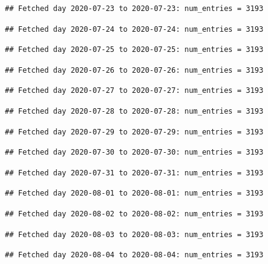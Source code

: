 \documentclass[]{article}
\begin{document}
\begin{verbatim}
## Fetched day 2020-07-23 to 2020-07-23: num_entries = 3193
\end{verbatim}

\begin{verbatim}
## Fetched day 2020-07-24 to 2020-07-24: num_entries = 3193
\end{verbatim}

\begin{verbatim}
## Fetched day 2020-07-25 to 2020-07-25: num_entries = 3193
\end{verbatim}

\begin{verbatim}
## Fetched day 2020-07-26 to 2020-07-26: num_entries = 3193
\end{verbatim}

\begin{verbatim}
## Fetched day 2020-07-27 to 2020-07-27: num_entries = 3193
\end{verbatim}

\begin{verbatim}
## Fetched day 2020-07-28 to 2020-07-28: num_entries = 3193
\end{verbatim}

\begin{verbatim}
## Fetched day 2020-07-29 to 2020-07-29: num_entries = 3193
\end{verbatim}

\begin{verbatim}
## Fetched day 2020-07-30 to 2020-07-30: num_entries = 3193
\end{verbatim}

\begin{verbatim}
## Fetched day 2020-07-31 to 2020-07-31: num_entries = 3193
\end{verbatim}

\begin{verbatim}
## Fetched day 2020-08-01 to 2020-08-01: num_entries = 3193
\end{verbatim}

\begin{verbatim}
## Fetched day 2020-08-02 to 2020-08-02: num_entries = 3193
\end{verbatim}

\begin{verbatim}
## Fetched day 2020-08-03 to 2020-08-03: num_entries = 3193
\end{verbatim}

\begin{verbatim}
## Fetched day 2020-08-04 to 2020-08-04: num_entries = 3193
\end{verbatim}
\end{document}
